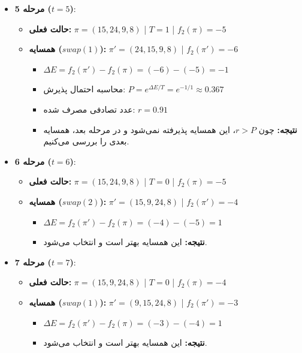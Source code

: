 \begin{ابجد}
\begin{itemize}
    \item \textbf{مرحله 5 ($t=5$)}:
          \begin{itemize}
              \item \textbf{حالت فعلی:} $\pi = (15, 24, 9, 8)$ | $T = 1$ | $f_2(\pi) = -5$
              \item \textbf{همسایه ($swap(1)$):} $\pi' = (24, 15, 9, 8)$ | $f_2(\pi') = -6$
                    \begin{itemize}
                        \item $\Delta E = f_2(\pi') - f_2(\pi) = (-6) - (-5) = -1$
                        \item محاسبه احتمال پذیرش: $P = e^{\Delta E / T} = e^{-1/1} \approx 0.367$
                        \item عدد تصادفی مصرف شده: $r = 0.91$
                        \item \textbf{نتیجه:} چون $r > P$، این همسایه پذیرفته نمی‌شود و در مرحله بعد، همسایه بعدی را بررسی می‌کنیم.
                    \end{itemize}
          \end{itemize}

          \vspace{0.7cm}

    \item \textbf{مرحله 6 ($t=6$)}:
          \begin{itemize}
              \item \textbf{حالت فعلی:} $\pi = (15, 24, 9, 8)$ | $T = 0$ | $f_2(\pi) = -5$
              \item \textbf{همسایه ($swap(2)$):} $\pi' = (15, 9, 24, 8)$ | $f_2(\pi') = -4$
                    \begin{itemize}
                        \item $\Delta E = f_2(\pi') - f_2(\pi) = (-4) - (-5) = 1$
                        \item \textbf{نتیجه:} این همسایه بهتر است و انتخاب می‌شود.
                    \end{itemize}
          \end{itemize}

          \vspace{0.7cm}

    \item \textbf{مرحله 7 ($t=7$)}:
          \begin{itemize}
              \item \textbf{حالت فعلی:} $\pi = (15, 9, 24, 8)$ | $T = 0$ | $f_2(\pi) = -4$
              \item \textbf{همسایه ($swap(1)$):} $\pi' = (9, 15, 24, 8)$ | $f_2(\pi') = -3$
                    \begin{itemize}
                        \item $\Delta E = f_2(\pi') - f_2(\pi) = (-3) - (-4) = 1$
                        \item \textbf{نتیجه:} این همسایه بهتر است و انتخاب می‌شود.
                    \end{itemize}
          \end{itemize}


\end{itemize}
\end{ابجد}
